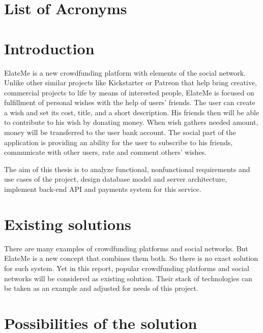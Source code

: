 \documentclass[12pt,a4paper]{report}
\begin{document}
\newpage
\section*{List of Acronyms}
\begin{acronym}
\end{acronym}


\section{Introduction}
 
ElateMe is a new crowdfunding platform with elements of the social network. Unlike other similar projects like Kickstarter or Patreon that help bring creative, commercial projects to life by means of  interested people, ElateMe is focused on fulfillment of personal wishes with the help of users’ friends. The user can create a wish and set its cost, title, and a short description. His friends then will be able to contribute to his wish by donating money. When wish gathers needed amount, money will be transferred to the user bank account. The social part of the application is providing an ability for the user to subscribe to his friends, communicate with other users, rate and comment others’ wishes. \par
The aim of this thesis is to analyze functional, nonfunctional requirements and use cases of the project, design database model and server architecture, implement back-end \ac{API} and payments system for this service.



\section{Existing solutions}

There are many examples of crowdfunding platforms and social networks. But ElateMe is a new concept that combines them both. So there is no exact solution for such system. Yet in this report, popular crowdfunding platforms and social networks will be considered as existing solution. Their stack of technologies can be taken as an example and adjusted for needs of this project.



\section{Possibilities of the solution}
\end{document}
